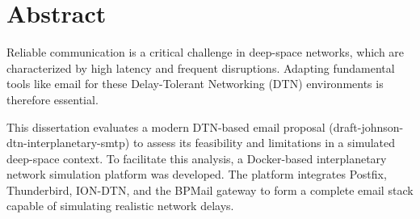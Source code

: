 \documentclass[a4paper,oneside,12pt]{book}
\title{\thesistitle}
\author{\authorname}
\newcommand{\typeofthesis}{Dissertation} %
\begin{document}

\doublespacing






\newpage
\chapter{Abstract}





Reliable communication is a critical challenge in deep-space networks, which are characterized by high latency and frequent disruptions. Adapting fundamental tools like email for these Delay-Tolerant Networking (DTN) environments is therefore essential.

This dissertation evaluates a modern DTN-based email proposal (draft-johnson-dtn-interplanetary-smtp) to assess its feasibility and limitations in a simulated deep-space context. To facilitate this analysis, a Docker-based interplanetary network simulation platform was developed. The platform integrates Postfix, Thunderbird, ION-DTN, and the BPMail gateway to form a complete email stack capable of simulating realistic network delays.
\end{document}
